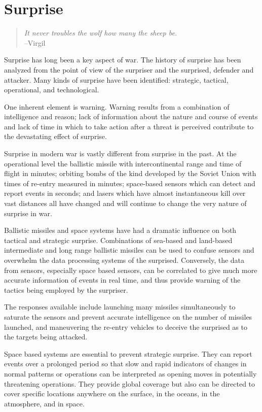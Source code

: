 \chapter{Surprise}
\begin{quotation}
    \textit{It never troubles the wolf how many the sheep be.} \\
    --Virgil
\end{quotation}

Surprise has long been a key aspect of war. The history of surprise has been analyzed from the point of view of the surpriser and the surprised, defender and attacker. Many kinds of surprise have been identified: strategic, tactical, operational, and technological.

One inherent element is warning. Warning results from a combination of intelligence and reason; lack of information about the nature and course of events and lack of time in which to take action after a threat is perceived contribute to the devastating effect of surprise.

Surprise in modern war is vastly different from surprise in the past. At the operational level the ballistic missile with intercontinental range and time of flight in minutes; orbiting bombs of the kind developed by the Soviet Union with times of re-entry measured in minutes; space-based sensors which can detect and report events in seconds; and lasers which have almost instantaneous kill over vast distances all have changed and will continue to change the very nature of surprise in war.

Ballistic missiles and space systems have had a dramatic influence on both tactical and strategic surprise. Combinations of sea-based and land-based intermediate and long range ballistic missiles can be used to confuse sensors and overwhelm the data processing systems of the surprised. Conversely, the data from sensors, especially space based sensors, can be correlated to give much more accurate information of events in real time, and thus provide warning of the tactics being employed by the surpriser.

The responses available include launching many missiles simultaneously to saturate the sensors and prevent accurate intelligence on the number of missiles launched, and maneuvering the re-entry vehicles to deceive the surprised as to the targets being attacked.

Space based systems are essential to prevent strategic surprise. They can report events over a prolonged period so that slow and rapid indicators of changes in normal patterns or operations can be interpreted as opening moves in potentially threatening operations. They provide global coverage but also can be directed to cover specific locations anywhere on the surface, in the oceans, in the atmosphere, and in space.


